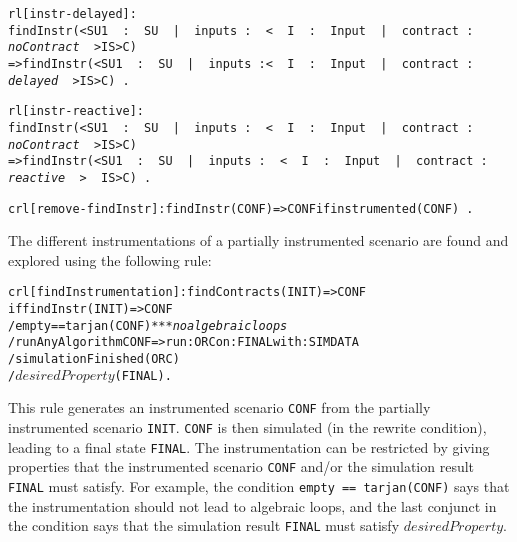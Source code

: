 \small
\begin{alltt}
rl [instr-delayed]: 
 findInstr(< SU1\,\,:\,\,SU\,\,|\,\,inputs\,:\,\,<\,\,I\,\,:\,\,Input\,\,|\,\,contract\,:\,\,\emph{noContract}\,\,> IS > C)
=> findInstr(< SU1\,\,:\,\,SU\,\,|\,\,inputs\,: <\,\,I\,\,:\,\,Input\,\,|\,\,contract\,:\,\,\emph{delayed}\,\,> IS > C)\,.

rl [instr-reactive]: 
 findInstr(< SU1\,\,:\,\,SU\,\,|\,\,inputs\,:\,\,<\,\,I\,\,:\,\,Input\,\,|\,\,contract\,:\,\,\emph{noContract}\,\,> IS > C)
=> findInstr(< SU1\,\,:\,\,SU\,\,|\,\,inputs\,:\,\,<\,\,I\,\,:\,\,Input\,\,|\,\,contract\,:\,\,\emph{reactive}\,\,>\,\,IS > C)\,.

crl [remove-findInstr]: findInstr(CONF) => CONF if instrumented(CONF)\,.
\end{alltt}
\normalsize

The different instrumentations of a partially instrumented scenario
are found and explored using the following rule: 

\small
\begin{alltt}
crl [findInstrumentation]: findContracts(INIT) => CONF
  if findInstr(INIT) => CONF
  / empty == tarjan(CONF)            *** \emph{no algebraic loops}
  / runAnyAlgorithm CONF => run: ORC on: FINAL with: SIMDATA
  / simulationFinished(ORC)
  / \(\mathit{desiredProperty}\)(FINAL) .
\end{alltt}
\normalsize

\noindent This rule  generates an
instrumented scenario \texttt{CONF} from the partially instrumented
scenario \texttt{INIT}. 
\texttt{CONF} is then simulated (in the rewrite condition), leading to
a final state \texttt{FINAL}. 
The  instrumentation can be restricted by giving
properties that the instrumented scenario \texttt{CONF} and/or
the  simulation result \texttt{FINAL} must satisfy. 
For example, the condition \texttt{empty ==
tarjan(CONF)} says that the  instrumentation should not  lead to
algebraic loops, and the last conjunct in the condition
says that the simulation result \texttt{FINAL} must satisfy  
\(\mathit{desiredProperty}\). 
%

